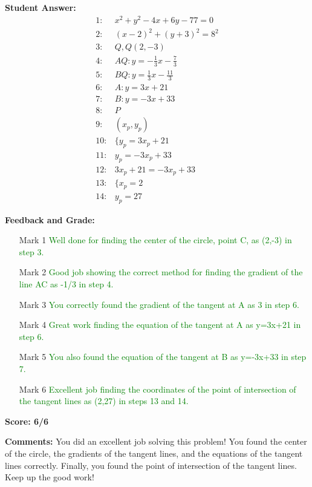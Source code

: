 \documentclass{article}
\begin{document}
\textbf{Student Answer:}
\begin{align*}
1: & x^2+y^2-4x+6y-77=0 \\
2: & (x-2)^2+(y+3)^2=8^2 \\
3: & Q,Q(2,-3) \\
4: & AQ:y=-\frac{1}{3}x-\frac{7}{3} \\
5: & BQ:y=\frac{1}{3}x-\frac{11}{3} \\
6: & A:y=3x+21 \\
7: & B:y=-3x+33 \\
8: & P \\
9: & (x_p,y_p) \\
10: & \{y_p=3x_p+21 \\
11: & y_p=-3x_p+33 \\
12: & 3x_p+21=-3x_p+33 \\
13: & \{x_p=2 \\
14: & y_p=27
\end{align*}

\textbf{Feedback and Grade:}
\begin{itemize}
\item[Mark 1] \textcolor{green}{Well done for finding the center of the circle, point C, as (2,-3) in step 3.}
\item[Mark 2] \textcolor{green}{Good job showing the correct method for finding the gradient of the line AC as -1/3 in step 4.}
\item[Mark 3] \textcolor{green}{You correctly found the gradient of the tangent at A as 3 in step 6.}
\item[Mark 4] \textcolor{green}{Great work finding the equation of the tangent at A as y=3x+21 in step 6.}
\item[Mark 5] \textcolor{green}{You also found the equation of the tangent at B as y=-3x+33 in step 7.}
\item[Mark 6] \textcolor{green}{Excellent job finding the coordinates of the point of intersection of the tangent lines as (2,27) in steps 13 and 14.}
\end{itemize}

\textbf{Score: 6/6}

\textbf{Comments:} You did an excellent job solving this problem! You found the center of the circle, the gradients of the tangent lines, and the equations of the tangent lines correctly. Finally, you found the point of intersection of the tangent lines. Keep up the good work!
\end{document}
